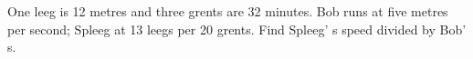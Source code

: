 One leeg is 12 metres and three grents are 32 minutes. Bob runs at five metres per second; Spleeg at 13 leegs per 20 grents. Find Spleeg' s speed divided by Bob' s.
